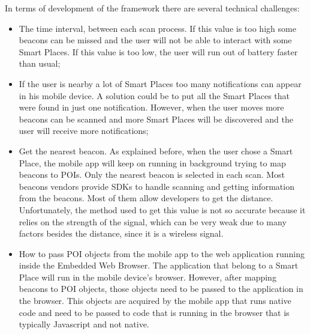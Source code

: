 In terms of development of the framework there are
several technical challenges:
\begin{itemize}

\item The time interval, between each
scan process.
If this value is too high
some beacons can be missed and the user will
not be able to interact with some Smart Places.
If this value is too low, the user will run out
of battery faster than usual;

\item If the user is nearby a lot of Smart Places
too many notifications can appear in his mobile
device. A solution could be to put all
the Smart Places that were found in just one
notification. However, when the user moves more
beacons can be scanned and more Smart Places
will be discovered and the user will receive
more notifications;

\item Get the nearest beacon. As explained before,
when the user chose a Smart Place, the mobile
app will keep on running in background 
trying to map beacons to POIs. Only the
nearest beacon is selected in each scan.
Most beacons vendors provide SDKs to handle
scanning and getting information from the beacons.
Most of them allow developers to get the distance.
Unfortunately, the method used to get this
value is not so accurate because it relies on the strength
of the signal, which can be very weak due to
many factors besides the distance, since it
is a wireless signal.

\item How to pass POI objects from the mobile
app to the web application running inside the
Embedded Web Browser.
The application that belong to a Smart Place
will run in the mobile device's browser.
However, after mapping beacons to POI objects,
those objects need to be passed to the 
application in the browser. This objects
are acquired by the mobile app that runs
native code and need to be passed to
code that is running in the browser
that is typically Javascript and not native.

\end{itemize}

